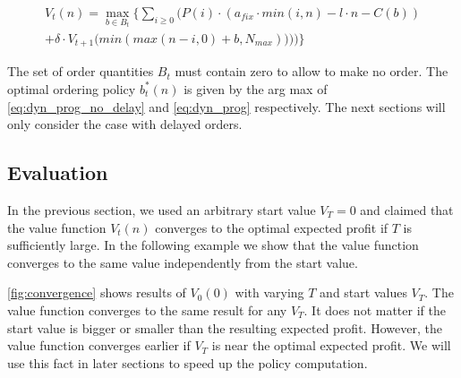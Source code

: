 \begin{equation}
\begin{split}
V_t(n) = \max_{b \in B_t} \Bigg\{
	\sum_{i \geq 0} \Big(
		P(i) \cdot (
			a_{fix} \cdot min(i, n) %
			- l \cdot n %
			- C(b) %
		) \\
		+ \delta \cdot V_{t+1}\big(min(max(n - i, 0) + b, N_{max}))\big)
	\Big)\Bigg\}
\end{split}
\label{eq:dyn_prog}
\end{equation}

The set of order quantities $B_t$ must contain zero to allow to make no order.
The optimal ordering policy $b_t^*(n)$ is given by the arg max of \cref{eq:dyn_prog_no_delay} and \cref{eq:dyn_prog} respectively.
The next sections will only consider the case with delayed orders.

\subsection{Evaluation}
In the previous section, we used an arbitrary start value $V_T = 0$ and claimed that the value function $V_t(n)$ converges to the optimal expected profit if $T$ is sufficiently large.
In the following example we show that the value function converges to the same value independently from the start value.

\cref{fig:convergence} shows results of $V_0(0)$ with varying $T$ and start values $V_T$.
The value function converges to the same result for any $V_T$.
It does not matter if the start value is bigger or smaller than the resulting expected profit.
However, the value function converges earlier if $V_T$ is near the optimal expected profit.
We will use this fact in later sections to speed up the policy computation.

